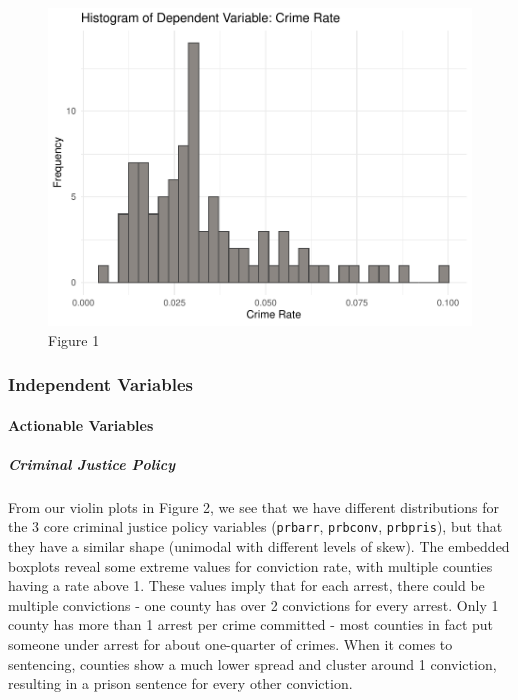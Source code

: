 \documentclass[]{article}
\let\oldparagraph\paragraph
\renewcommand{\paragraph}[1]{\oldparagraph{#1}\mbox{}}
\let\oldsubparagraph\subparagraph
\renewcommand{\subparagraph}[1]{\oldsubparagraph{#1}\mbox{}}
\begin{document}
\begin{figure}

{\centering \includegraphics{lab_3_final_files/figure-latex/unnamed-chunk-10-1} 

}

\caption{Figure 1}\label{fig:unnamed-chunk-10}
\end{figure}

\hypertarget{independent-variables}{%
\subsubsection{Independent Variables}\label{independent-variables}}

\hypertarget{actionable-variables-1}{%
\paragraph{Actionable Variables}\label{actionable-variables-1}}

\hypertarget{criminal-justice-policy-1}{%
\subparagraph{Criminal Justice Policy}\label{criminal-justice-policy-1}}

From our violin plots in Figure 2, we see that we have different
distributions for the 3 core criminal justice policy variables
(\texttt{prbarr}, \texttt{prbconv}, \texttt{prbpris}), but that they
have a similar shape (unimodal with different levels of skew). The
embedded boxplots reveal some extreme values for conviction rate, with
multiple counties having a rate above 1. These values imply that for
each arrest, there could be multiple convictions - one county has over 2
convictions for every arrest. Only 1 county has more than 1 arrest per
crime committed - most counties in fact put someone under arrest for
about one-quarter of crimes. When it comes to sentencing, counties show
a much lower spread and cluster around 1 conviction, resulting in a
prison sentence for every other conviction.
\end{document}
